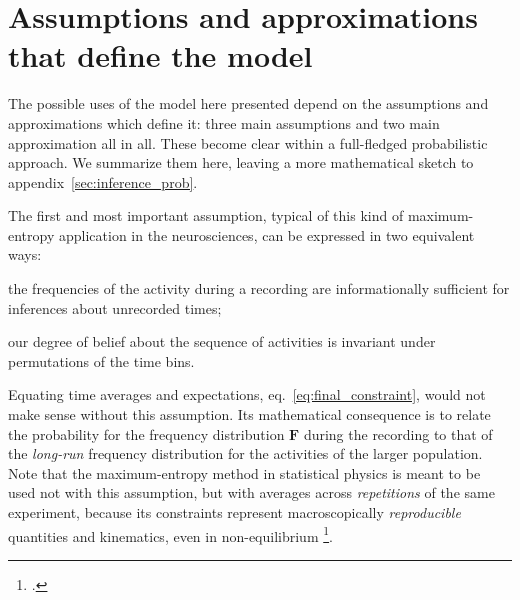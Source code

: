 \documentclass[\ifafour a4paper,12pt,\else a5paper,10pt,\fi%
onecolumn,oneside,article,%
british%
]{memoir}
\theoremstyle{remark}
\theoremstyle{innote}
\newcommand*{\citep}{\footcites}
\renewcommand*{\|}{\nonscript\,\vert\nonscript\;\mathopen{}}
\newcommand*{\eqn}{eq.}%
\newcommand*{\eg}{{e.g.}}
\newcommand*{\yFF}{F}
\newcommand*{\yF}{\bm{\yFF}}
\begin{document}
\section{Assumptions and approximations that define the model}
\label{sec:assumptions}

The possible uses of the model here presented depend on the assumptions and
approximations which define it: three main assumptions and two main
approximation all in all. These become clear within a full-fledged
probabilistic approach. We summarize them here, leaving a more mathematical
sketch to appendix~\ref{sec:inference_prob}.

The first and most important assumption, typical of this kind of
maximum-entropy application in the neurosciences, can be expressed in two
equivalent ways:
\begin{enumerate*}[(\roman*)]
\item the frequencies of the activity during a recording are
  informationally sufficient for inferences about unrecorded times; \item
  our degree of belief about the sequence of activities is invariant under
  permutations of the time bins.
\end{enumerate*}
Equating time averages and expectations, \eqn~\eqref{eq:final_constraint},
would not make sense without this assumption. Its mathematical consequence
is to relate the probability for the frequency distribution $\yF$ during
the recording to that of the \emph{long-run} frequency distribution for the
activities of the larger population. Note that the maximum-entropy method
in statistical physics is meant to be used not with this assumption, but
with averages across \emph{repetitions} of the same experiment, because its
constraints represent macroscopically \emph{reproducible} quantities and
kinematics, even in non-equilibrium
\citep{jaynes1985b_r1996,%
grandy1988,%
deroecketal2005_r2006%
}[for experiments \eg][]{guntonetal1983}.
\end{document}

